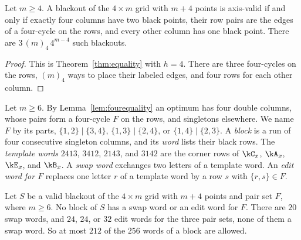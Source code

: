\begin{lemma}\label{lem:fourequality}
Let $m\ge4$. A blackout of the $4\times m$ grid with $m+4$ points is axis-valid if and only if exactly four columns have two black points, their row pairs are the edges of a four-cycle on the rows, and every other column has one black point. There are $3\,(m)_4\,4^{m-4}$ such blackouts.
\end{lemma}

\begin{proof}
This is Theorem~\ref{thm:equality} with $h=4$. There are three four-cycles on the rows, $(m)_4$ ways to place their labeled edges, and four rows for each other column.
\end{proof}

Let $m\ge6$. By Lemma~\ref{lem:fourequality} an optimum has four double columns, whose pairs form a four-cycle $F$ on the rows, and singletons elsewhere. We name $F$ by its parts, $\{1,2\}\mid\{3,4\}$, $\{1,3\}\mid\{2,4\}$, or $\{1,4\}\mid\{2,3\}$. A \emph{block} is a run of four consecutive singleton columns, and its \emph{word} lists their black rows. The \emph{template words} $2413$, $3412$, $2143$, and $3142$ are the corner rows of $\kC_x$, $\kA_x$, $\kE_x$, and $\kB_x$. A \emph{swap word} exchanges two letters of a template word. An \emph{edit word for $F$} replaces one letter $r$ of a template word by a row $s$ with $\{r,s\}\in F$.

\begin{lemma}\label{lem:blocks}
Let $S$ be a valid blackout of the $4\times m$ grid with $m+4$ points and pair set $F$, where $m\ge6$. No block of $S$ has a swap word or an edit word for $F$. There are $20$ swap words, and $24$, $24$, or $32$ edit words for the three pair sets, none of them a swap word. So at most $212$ of the $256$ words of a block are allowed.
\end{lemma}

